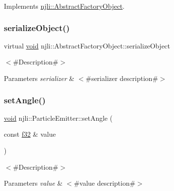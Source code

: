 Implements \mbox{\hyperlink{classnjli_1_1_abstract_factory_object_aad2fbe86fb3bdecf02918a96b9c57976}{njli\+::\+Abstract\+Factory\+Object}}.

\mbox{\label{classnjli_1_1_particle_emitter_a4fc4bcd9d1930911474210c047372fc0}} 
\subsubsection{\texorpdfstring{serialize\+Object()}{serializeObject()}}
{\footnotesize\ttfamily virtual \mbox{\hyperlink{_thread_8h_af1e856da2e658414cb2456cb6f7ebc66}{void}} njli\+::\+Abstract\+Factory\+Object\+::serialize\+Object}

$<$\#\+Description\#$>$


\begin{DoxyParams}{Parameters}
{\em serializer} & $<$\#serializer description\#$>$ \\
\hline
\end{DoxyParams}
\mbox{\label{classnjli_1_1_particle_emitter_a3f3072237c7afe532c31abb83db0cb81}} 
\subsubsection{\texorpdfstring{set\+Angle()}{setAngle()}}
{\footnotesize\ttfamily \mbox{\hyperlink{_thread_8h_af1e856da2e658414cb2456cb6f7ebc66}{void}} njli\+::\+Particle\+Emitter\+::set\+Angle (\begin{DoxyParamCaption}\item[{const \mbox{\hyperlink{_util_8h_a5f6906312a689f27d70e9d086649d3fd}{f32}} \&}]{value }\end{DoxyParamCaption})}

$<$\#\+Description\#$>$


\begin{DoxyParams}{Parameters}
{\em value} & $<$\#value description\#$>$ \\
\hline
\end{DoxyParams}
\mbox{\label{classnjli_1_1_particle_emitter_a2b3137d3f6b7008bec04a21dbda09d11}} 
